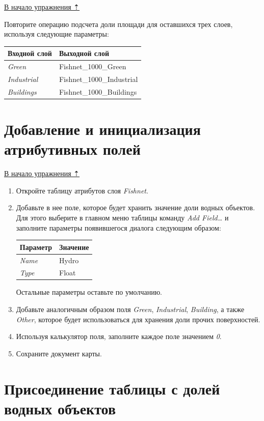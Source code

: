 \documentclass[]{book}
\theoremstyle{definition}
\theoremstyle{definition}
\theoremstyle{definition}
\theoremstyle{remark}
\begin{document}
\protect\hyperlink{land-cover-hydro}{В начало упражнения ⇡}

Повторите операцию подсчета доли площади для оставшихся трех слоев,
используя следующие параметры:

\begin{longtable}[]{@{}ll@{}}
\toprule
Входной слой & Выходной слой\tabularnewline
\midrule
\endhead
\emph{Green} & Fishnet\_1000\_Green\tabularnewline
\emph{Industrial} & Fishnet\_1000\_Industrial\tabularnewline
\emph{Buildings} & Fishnet\_1000\_Buildings\tabularnewline
\bottomrule
\end{longtable}

\hypertarget{land-cover-hydro-fields}{%
\section{Добавление и инициализация атрибутивных
полей}\label{land-cover-hydro-fields}}

\protect\hyperlink{land-cover-hydro}{В начало упражнения ⇡}

\begin{enumerate}
\def\labelenumi{\arabic{enumi}.}
\item
  Откройте таблицу атрибутов слоя \emph{Fishnet}.
\item
  Добавьте в нее поле, которое будет хранить значение доли водных
  объектов. Для этого выберите в главном меню таблицы команду \emph{Add
  Field\ldots{}} и заполните параметры появившегося диалога следующим
  образом:

  \begin{longtable}[]{@{}ll@{}}
  \toprule
  Параметр & Значение\tabularnewline
  \midrule
  \endhead
  \emph{Name} & Hydro\tabularnewline
  \emph{Type} & Float\tabularnewline
  \bottomrule
  \end{longtable}

  Остальные параметры оставьте по умолчанию.
\item
  Добавьте аналогичным образом поля \emph{Green}, \emph{Industrial},
  \emph{Building}, а также \emph{Other}, которое будет использоваться
  для хранения доли прочих поверхностей.
\item
  Используя калькулятор поля, заполните каждое поле значением \emph{0}.
\item
  Сохраните документ карты.
\end{enumerate}

\hypertarget{land-cover-hydro-water-tables}{%
\section{Присоединение таблицы с долей водных
объектов}\label{land-cover-hydro-water-tables}}
\end{document}
